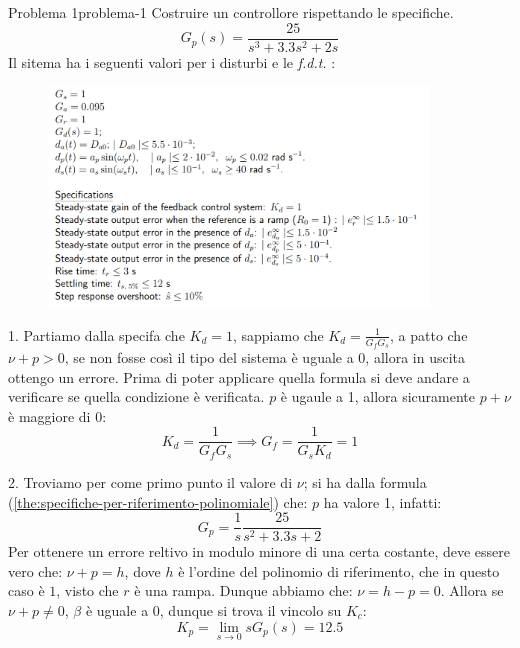 \documentclass[12pt]{article}
\begin{document}
\newpage
\begin{problem}{Problema 1}{problema-1}
    Costruire un controllore rispettando le specifiche.
    \[ G_p(s) = \frac{25}{s^{3} + 3.3s^{2} + 2s}  \]
    Il sitema ha i seguenti valori per i disturbi e le \emph{f.d.t.} :
    \begin{figure}[H]
        \includegraphics[width=0.9\textwidth]{dati-problema-1.png}
    \end{figure}

    1. Partiamo dalla specifa che $K_d = 1$, sappiamo che $K_d = \frac{1}{G_fG_s}$, a patto che $\nu + p > 0$, se non fosse cos\`i il tipo del sistema \`e uguale a 0, allora in uscita ottengo un errore. Prima di poter applicare quella formula si deve andare a verificare se quella condizione \`e verificata. $p$ \`e ugaule a 1, allora sicuramente $p + \nu$ \`e maggiore di 0:
    \[ K_d = \frac{1}{G_fG_s} \implies G_f = \frac{1}{G_sK_d}  = 1 \]

    2. Troviamo per come primo punto il valore di $\nu$; si ha dalla formula (\ref{the:specifiche-per-riferimento-polinomiale}) che: $p$ ha valore 1, infatti:
    \[ G_p = \frac{1}{s} \frac{25}{s^{2} + 3.3s + 2}  \]
    Per ottenere un errore reltivo in modulo minore di una certa costante, deve essere vero che: $\nu + p = h$, dove $h$ \`e l'ordine del polinomio di riferimento, che in questo caso \`e $1$, visto che $r$ \`e una rampa. Dunque abbiamo che: $\nu = h - p = 0$. Allora se $\nu + p \neq 0$, $\beta$ \`e uguale a 0, dunque si trova il vincolo su $K_c$:
    \[ K_p = \lim_{s \to 0} sG_p(s) = 12.5 \]


\end{problem}
\end{document}
